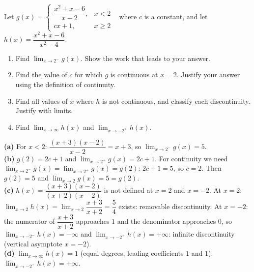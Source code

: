 \documentclass[11pt]{article}
\begin{document}
\begin{exo}{}
Let $g(x)=\begin{cases}\dfrac{x^2+x-6}{x-2}, & x<2\\[6pt] cx+1, & x\ge2\end{cases}$ \ where $c$ is a constant, and let $h(x)=\dfrac{x^2+x-6}{x^2-4}$.
\begin{enumerate}[label=(\alph*)]
\item Find $\displaystyle\lim_{x\to2^-}g(x)$. Show the work that leads to your answer.
\item Find the value of $c$ for which $g$ is continuous at $x=2$. Justify your answer using the definition of continuity.
\item Find all values of $x$ where $h$ is not continuous, and classify each discontinuity. Justify with limits.
\item Find $\displaystyle\lim_{x\to\infty}h(x)$ and $\displaystyle\lim_{x\to-2^+}h(x)$.
\end{enumerate}
\begin{solution}
\textbf{(a)} For $x<2$: $\dfrac{(x+3)(x-2)}{x-2}=x+3$, so $\lim_{x\to2^-}g(x)=5$.\\
\textbf{(b)} $g(2)=2c+1$ and $\lim_{x\to2^+}g(x)=2c+1$. For continuity we need $\lim_{x\to2^-}g(x)=\lim_{x\to2^+}g(x)=g(2)$: $2c+1=5$, so $c=2$. Then $g(2)=5$ and $\lim_{x\to2}g(x)=5=g(2)$.\\
\textbf{(c)} $h(x)=\dfrac{(x+3)(x-2)}{(x+2)(x-2)}$ is not defined at $x=2$ and $x=-2$.
At $x=2$: $\lim_{x\to2}h(x)=\lim_{x\to2}\dfrac{x+3}{x+2}=\dfrac54$ exists: removable discontinuity.
At $x=-2$: the numerator of $\dfrac{x+3}{x+2}$ approaches $1$ and the denominator approaches $0$, so $\lim_{x\to-2^-}h(x)=-\infty$ and $\lim_{x\to-2^+}h(x)=+\infty$: infinite discontinuity (vertical asymptote $x=-2$).\\
\textbf{(d)} $\lim_{x\to\infty}h(x)=1$ (equal degrees, leading coefficients $1$ and $1$). $\lim_{x\to-2^+}h(x)=+\infty$.
\end{solution}
\end{exo}
\end{document}
